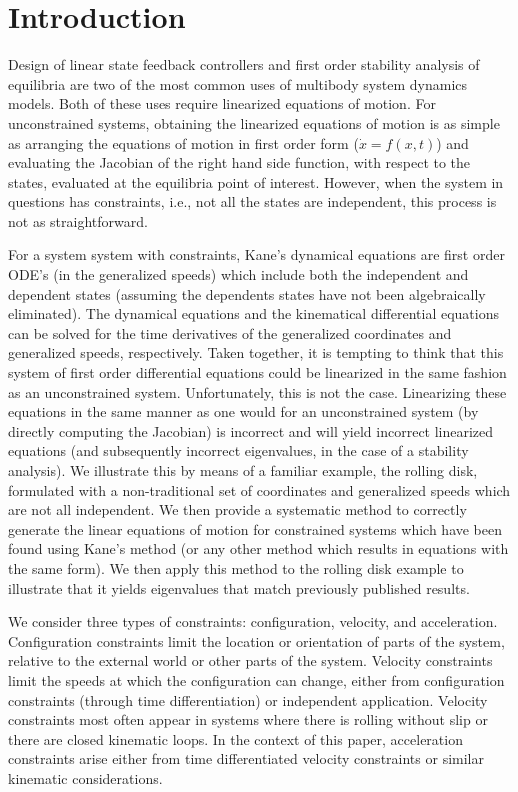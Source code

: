 \documentclass[smallcondensed,final]{svjour3}                     %
\begin{document}
\section{Introduction}
\label{sec:intro}
Design of linear state feedback controllers and first order stability analysis
of equilibria are two of the most common uses of multibody system dynamics
models. Both of these uses require linearized equations of motion. For
unconstrained systems, obtaining the linearized equations of motion is as
simple as arranging the equations of motion in first order form ($\dot{x} =
f(x, t)$) and evaluating the Jacobian of the right hand side function, with
respect to the states, evaluated at the equilibria point of interest.  However,
when the system in questions has constraints, i.e., not all the states are
independent, this process is not as straightforward.

For a system system with constraints, Kane's dynamical equations\cite{Kane1985}
are first order ODE's (in the generalized speeds) which include both the
independent and dependent states (assuming the dependents states have not been
algebraically eliminated). The dynamical equations and the kinematical
differential equations can be solved for the time derivatives of the
generalized coordinates and generalized speeds, respectively. Taken together,
it is tempting to think that this system of first order differential equations
could be linearized in the same fashion as an unconstrained system.
Unfortunately, this is not the case. Linearizing these equations in the same
manner as one would for an unconstrained system (by directly computing the
Jacobian) is incorrect and will yield incorrect linearized equations (and
subsequently incorrect eigenvalues, in the case of a stability analysis). We
illustrate this by means of a familiar example, the rolling disk, formulated
with a non-traditional set of coordinates and generalized speeds which are not
all independent. We then provide a systematic method to correctly generate the
linear equations of motion for constrained systems which have been found using
Kane's method (or any other method which results in equations with the same
form). We then apply this method to the rolling disk example to illustrate that
it yields eigenvalues that match previously published results.

We consider three types of constraints: configuration, velocity, and
acceleration. Configuration constraints limit the location or orientation of
parts of the system, relative to the external world or other parts of the
system. Velocity constraints limit the speeds at which the configuration can
change, either from configuration constraints (through time differentiation) or
independent application. Velocity constraints most often appear in systems
where there is rolling without slip or there are closed kinematic loops. In the
context of this paper, acceleration constraints arise either from time
differentiated velocity constraints or similar kinematic considerations.
\end{document}
